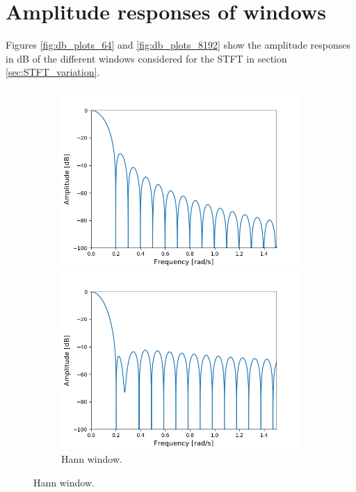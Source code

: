 \section{Amplitude responses of windows} \label{appD}
Figures \ref{fig:db_plots_64} and \ref{fig:db_plots_8192} show the amplitude responses in dB of the different windows considered for the STFT in section \ref{sec:STFT_variation}.

\begin{figure}[H]
\centering
\begin{subfigure}{0.49\textwidth}
\centering
\includegraphics[width=\textwidth]{figures/dbplots/stft_bilag/64/hann.png}
\caption{Hann window.}
\includegraphics[width=\textwidth]{figures/dbplots/stft_bilag/64/hamming.png}

\end{subfigure}
\end{figure}
